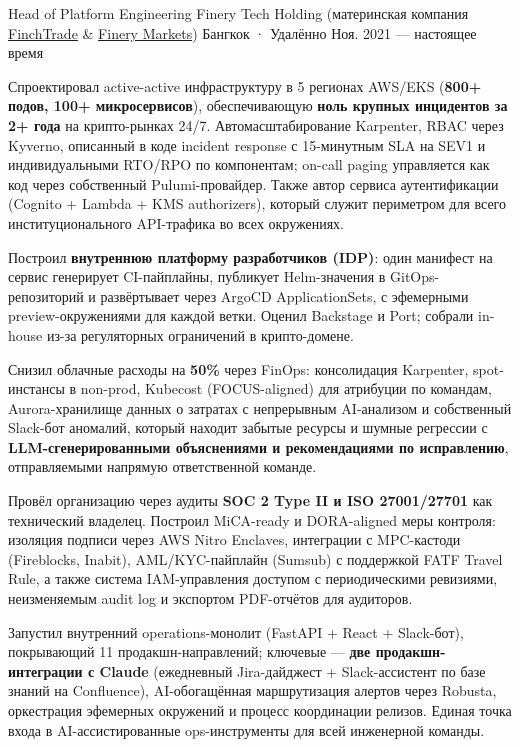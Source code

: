 \documentclass[10pt, a4paper]{awesome-cv}
\begin{document}
\begin{cventries}

  \cventry
    {Head of Platform Engineering}
    {Finery Tech Holding (материнская компания \href{https://finchtrade.com}{FinchTrade} \& \href{https://finerymarkets.com}{Finery Markets})}
    {Бангкок · Удалённо}
    {Ноя. 2021 — настоящее время}
    {
      \begin{cvitems}
        \item {Спроектировал active-active инфраструктуру в 5 регионах AWS/EKS (\textbf{800+ подов, 100+ микросервисов}), обеспечивающую \textbf{ноль крупных инцидентов за 2+ года} на крипто-рынках 24/7. Автомасштабирование Karpenter, RBAC через Kyverno, описанный в коде incident response с 15-минутным SLA на SEV1 и индивидуальными RTO/RPO по компонентам; on-call paging управляется как код через собственный Pulumi-провайдер. Также автор сервиса аутентификации (Cognito + Lambda + KMS authorizers), который служит периметром для всего институционального API-трафика во всех окружениях.}
        \item {Построил \textbf{внутреннюю платформу разработчиков (IDP)}: один манифест на сервис генерирует CI-пайплайны, публикует Helm-значения в GitOps-репозиторий и развёртывает через ArgoCD ApplicationSets, с эфемерными preview-окружениями для каждой ветки. Оценил Backstage и Port; собрали in-house из-за регуляторных ограничений в крипто-домене.}
        \item {Снизил облачные расходы на \textbf{50\%} через FinOps: консолидация Karpenter, spot-инстансы в non-prod, Kubecost (FOCUS-aligned) для атрибуции по командам, Aurora-хранилище данных о затратах с непрерывным AI-анализом и собственный Slack-бот аномалий, который находит забытые ресурсы и шумные регрессии с \textbf{LLM-сгенерированными объяснениями и рекомендациями по исправлению}, отправляемыми напрямую ответственной команде.}
        \item {Провёл организацию через аудиты \textbf{SOC 2 Type II и ISO 27001/27701} как технический владелец. Построил MiCA-ready и DORA-aligned меры контроля: изоляция подписи через AWS Nitro Enclaves, интеграции с MPC-кастоди (Fireblocks, Inabit), AML/KYC-пайплайн (Sumsub) с поддержкой FATF Travel Rule, а также система IAM-управления доступом с периодическими ревизиями, неизменяемым audit log и экспортом PDF-отчётов для аудиторов.}
        \item {Запустил внутренний operations-монолит (FastAPI + React + Slack-бот), покрывающий 11 продакшн-направлений; ключевые --- \textbf{две продакшн-интеграции с Claude} (ежедневный Jira-дайджест + Slack-ассистент по базе знаний на Confluence), AI-обогащённая маршрутизация алертов через Robusta, оркестрация эфемерных окружений и процесс координации релизов. Единая точка входа в AI-ассистированные ops-инструменты для всей инженерной команды.}

\end{cvitems}}
\end{cventries}
\end{document}
